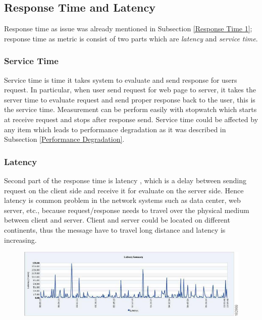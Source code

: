 \subsection{Response Time and Latency}
Response time as issue was already mentioned in Subsection \ref{Response Time 1}; response time as metric is consist of two parts which are \emph{latency} and \emph{service time}. 

\subsubsection*{Service Time}
Service time is time it takes system to evaluate and send response for users request. In particular, when user send request for web page to server, it takes the server time to evaluate request and send proper response back to the user, this is the service time. Measurement can be perform easily with stopwatch which starts at receive request and stops after response send. Service time could be affected by any item which leads to performance degradation as it was described in Subsection \ref{Performance Degradation}. 

\subsubsection*{Latency}
Second part of the response time is latency \cite{Broadwell:RPT, BHATT:PERF}, which is a delay between sending request on the client side and receive it for evaluate on the server side. Hence latency is common problem in the network systems such as data center, web server, etc., because request/response needs to travel over the physical medium between client and server. Client and server could be located on different continents, thus the message have to travel long distance and latency is increasing.  

\begin{figure}[H]
  \centering
  \includegraphics[width=15cm]{obrazky-figures/latency.jpg}
  \caption{}
  \label{fig:latency}
\end{figure}

